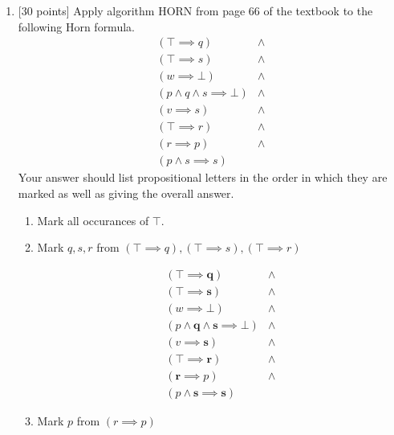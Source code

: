\documentclass{article}
\begin{document}
\begin{enumerate}
\begin{answer}
  
  
  \end{answer}
  

\item {[30 points]} Apply algorithm HORN from page 66 of the textbook
  to the following Horn formula.
  \begin{displaymath}
    \begin{array}{ll}
      (\top \implies q) &\land \\
      (\top \implies s) &\land \\
      (w \implies \bot) &\land \\
      (p \land q \land s \implies \bot) &\land \\
      (v \implies s) &\land \\
      (\top \implies r) &\land \\
      (r \implies p) &\land \\
      (p \land s \implies s)
    \end{array}
  \end{displaymath}
  Your answer should list propositional letters in the order in which
  they are marked as well as giving the overall answer.
  
  \begin{answer}
	\begin{enumerate}
	  \item Mark all occurances of $\top$.
	  	
	  \item Mark $q, s, r$ from $(\top \implies q), (\top \implies s),
	  (\top \implies r)$
	  
		\begin{displaymath}
    		\begin{array}{ll}
   				      (\top \implies \textbf{q}) &\land \\
                      (\top \implies \textbf{s}) &\land \\
                      (w \implies \bot) &\land \\
                      (p \land \textbf{q} \land \textbf{s} \implies \bot) &\land \\
                      (v \implies \textbf{s}) &\land \\
                      (\top \implies \textbf{r}) &\land \\
                      (\textbf{r} \implies p) &\land \\
                      (p \land \textbf{s} \implies \textbf{s})
    		\end{array}
  		\end{displaymath}
  		\item Mark $p$ from $(r \implies p)$
  		

\end{enumerate}
\end{answer}
\end{enumerate}
\end{document}
